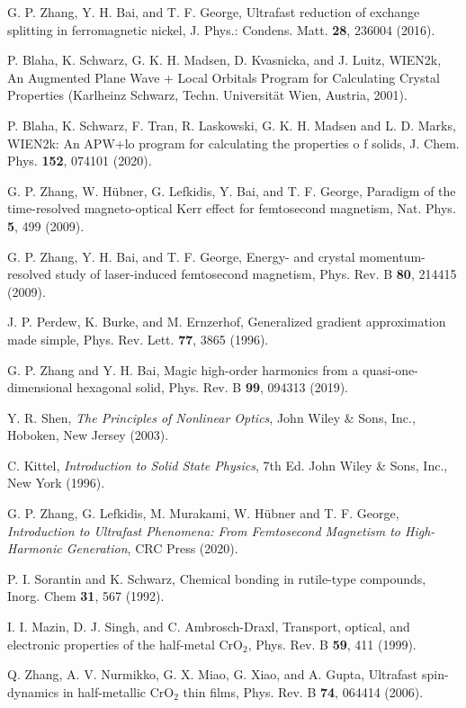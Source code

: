\documentclass[checkin,showpacs,psfig,aps,pra]{revtex4}
\begin{document}
\begin{thebibliography}{99}
G. P. Zhang, Y. H. Bai, and T. F. George, {Ultrafast
reduction of exchange splitting in ferromagnetic nickel}, J. Phys.:
Condens. Matt. {\bf 28}, 236004 (2016).

 P. Blaha, K. Schwarz, G. K. H. Madsen, D. Kvasnicka,
and J. Luitz, WIEN2k, An Augmented Plane Wave + Local Orbitals
Program for Calculating Crystal Properties (Karlheinz Schwarz,
Techn. Universit\"at Wien, Austria, 2001).

P. Blaha, K. Schwarz, F. Tran, R. Laskowski,
G. K. H. Madsen and L. D. Marks, {WIEN2k: An APW+lo program for
calculating the properties o f solids}, J. Chem. Phys. {\bf 152},
074101 (2020).

G. P. Zhang, W. H\"ubner, G. Lefkidis, Y. Bai, and
T. F. George, {Paradigm of the time-resolved magneto-optical Kerr
effect for femtosecond magnetism}, {Nat. Phys.} {\bf 5}, 499
(2009).

 G. P. Zhang, Y. H. Bai, and T. F. George, {Energy- and
crystal momentum-resolved study of laser-induced femtosecond
magnetism}, Phys. Rev. B {\bf 80}, 214415 (2009).

J. P. Perdew, K. Burke, and M. Ernzerhof, {Generalized
gradient approximation made simple}, Phys. Rev. Lett. {\bf 77}, 3865
(1996).

 G. P. Zhang and Y. H. Bai, {Magic high-order harmonics
from a quasi-one-dimensional hexagonal solid}, Phys. Rev. B {\bf
99}, 094313 (2019).

Y. R. Shen, {\it The Principles of Nonlinear Optics},
John Wiley \& Sons, Inc., Hoboken, New Jersey (2003).

C. Kittel, {\it Introduction to Solid State Physics},
7th Ed. John Wiley \& Sons, Inc., New York (1996).

G. P. Zhang, G. Lefkidis, M. Murakami, W.  H\"ubner
and T. F. George, {\it Introduction to Ultrafast Phenomena: From
Femtosecond Magnetism to High-Harmonic Generation}, CRC Press
(2020).

P. I. Sorantin and K. Schwarz, {Chemical bonding
in rutile-type compounds}, Inorg. Chem {\bf 31}, 567 (1992).

I. I. Mazin, D. J. Singh, and C.  Ambrosch-Draxl,
{Transport, optical, and electronic properties of the half-metal
CrO$_2$},  Phys. Rev. B {\bf 59}, 411 (1999).

Q. Zhang, A. V. Nurmikko, G. X. Miao, G. Xiao, and
A. Gupta, {Ultrafast spin-dynamics in half-metallic CrO$_2$ thin
films}, Phys. Rev. B {\bf 74}, 064414 (2006).


\end{thebibliography}
\end{document}
